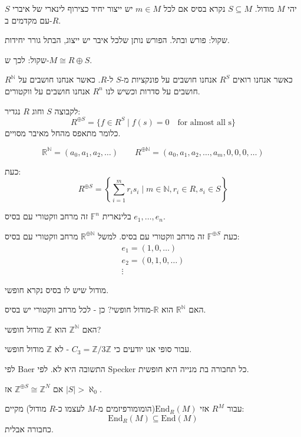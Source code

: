 \documentclass{tstextbook}
\begin{document}
\begin{definition}[בסיס]
יהי \(M\) מודול. \(S\subseteq M\) נקרא בסיס אם לכל \(m \in M\) יש ייצור יחיד כצירוף לינארי של איברי \(S\) עם מקדמים ב-\(R\).

\end{definition}
שקול: פורש ובתל. הפורש נותן שלכל איבר יש ייצוג, הבתל גורר יחידות.

שקול: לכך ש-\(M\cong R \oplus S\). 

\begin{reminder}
כאשר אנחנו רואים \(R^{S}\) אנחנו חושבים על פונקציות מ-\(S\) ל-\(R\). כאשר אנחנו חושבים על \(R^{\mathbb{N}}\) חושבים על סדרות וכשיש לנו \(R^{n}\) אנחנו חושבים על ווקטורים.

\end{reminder}
\begin{definition}
לקבוצה \(S\) וחוג \(R\) נגדיר:
$$R^{\oplus S}=\{ f \in R^{S}\mid  f(s)=0 \quad \text{for almost all s}\}$$
כלומר מתאפס מהחל מאיבר מסויים.

$$\mathbb{R}^{\mathbb{N}}=(a_{0},a_{1},a_{2},\dots)\qquad R^{\oplus \mathbb{N}}=(a_{0},a_{1},a_{2},\dots, a_{m},0,0,0,\dots)$$

\end{definition}
כעת:
$$R^{\oplus S}=\left\{  \sum_{i=1}^{m} r_{i}s_{i}\mid m \in \mathbb{N}, r_{i}\in R, s_{i}\in S  \right\}$$

בלינארית \(\mathbb{F}^{n}\) זה מרחב ווקטורי עם בסיס \(e_{1},\dots, e_{n}\).

כעת \(\mathbb{F}^{\oplus S}\) זה מרחב ווקטורי עם בסיס. למשל \(\mathbb{R}^{\oplus \mathbb{N}}\) מרחב ווקטורי עם בסיס:
$$\begin{gather}e_{1}=(1,0,\dots) \\e_{2}=(0,1,0,\dots) \\ \vdots
\end{gather}$$

מודול שיש לו בסיס נקרא חופשי.

האם \(\mathbb{R}^{\mathbb{N}}\) הוא \(\mathbb{R}\)-מודול חופשי?
כן - לכל מרחב ווקטורי יש בסיס.

האם \(\mathbb{Z}^{\mathbb{N}}\) הוא \(\mathbb{Z}\) מודול חופשי?

עבור סופי אנו יודעים כי \(C_{3}=\mathbb{Z} / 3\mathbb{Z}\) - לא \(\mathbb{Z}\) מודול חופשי.

לפי Baer התשובה היא לא.
לפי Specker כל תחבורה בת מנייה היא חופשית.

אם \(\mathbb{Z}^{\oplus S}\cong \mathbb{Z}^{N}\) אז \(|S|> \aleph_{0}\). 

עבור \(R^{M}\) אזי \(\mathrm{End}_{R}(M)\)(הומומורפיזמים מ-\(M\) לעצמו כ-\(R\) מודול) מקיים:
$$\mathrm{End}_{R}(M)\subseteq \mathrm{End}(M)$$
כחבורה אבלית.
\end{document}
